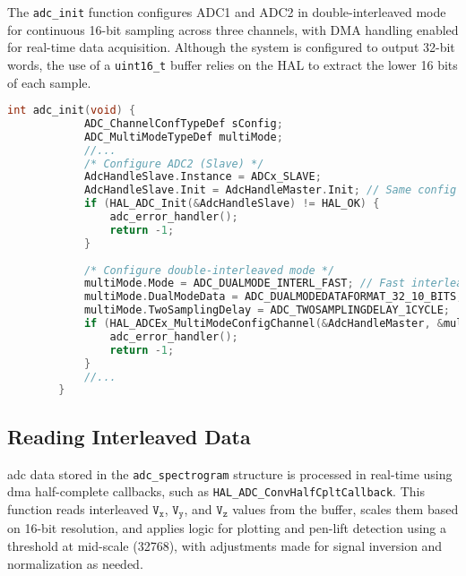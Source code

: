 \documentclass[class=report,11pt,crop=false]{standalone}
\begin{document}
	The \texttt{adc\_init} function configures ADC1 and ADC2 in double-interleaved mode for continuous 16-bit sampling across three channels, with DMA handling enabled for real-time data acquisition. Although the system is configured to output 32-bit words, the use of a \texttt{uint16\_t} buffer relies on the HAL to extract the lower 16 bits of each sample.
		
	\begin{lstlisting}[language=C, label={lst:das-spectrogram-init-code}, caption={Code snippet of the \texttt{adc\_init} function which configures the double-interleaved operation of the \acrshort{adc}s.}]
		int adc_init(void) {
			ADC_ChannelConfTypeDef sConfig;
			ADC_MultiModeTypeDef multiMode;
			//...
			/* Configure ADC2 (Slave) */
			AdcHandleSlave.Instance = ADCx_SLAVE;
			AdcHandleSlave.Init = AdcHandleMaster.Init; // Same config as master
			if (HAL_ADC_Init(&AdcHandleSlave) != HAL_OK) {
				adc_error_handler();
				return -1;
			}
			
			/* Configure double-interleaved mode */
			multiMode.Mode = ADC_DUALMODE_INTERL_FAST; // Fast interleaved mode
			multiMode.DualModeData = ADC_DUALMODEDATAFORMAT_32_10_BITS;
			multiMode.TwoSamplingDelay = ADC_TWOSAMPLINGDELAY_1CYCLE;
			if (HAL_ADCEx_MultiModeConfigChannel(&AdcHandleMaster, &multiMode) != HAL_OK) {
				adc_error_handler();
				return -1;
			}
			//...
		}
	\end{lstlisting}

	\subsection{Reading Interleaved Data}
	
	\acrshort{adc} data stored in the \texttt{adc\_spectrogram} structure is processed in real-time using \acrshort{dma} half-complete callbacks, such as \texttt{HAL\_ADC\_ConvHalfCpltCallback}. This function reads interleaved $\texttt{V}_\texttt{x}$, $\texttt{V}_\texttt{y}$, and $\texttt{V}_\texttt{z}$ values from the buffer, scales them based on 16-bit resolution, and applies logic for plotting and pen-lift detection using a threshold at mid-scale (32768), with adjustments made for signal inversion and normalization as needed.
	
\end{document}
